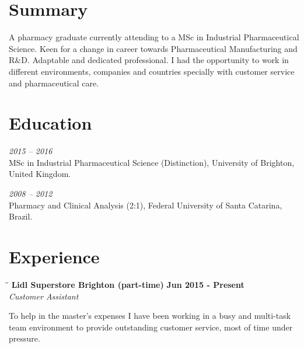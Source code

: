 \documentclass[margin]{res}
\begin{document}
  

\address{Brighton, UK \\ gra.gadotti@gmail.com \\ Phone: +44 07405105756 \\ Post Code: BN21HF }
                           
                        
\begin{resume}                        
 
\section{Summary} A pharmacy graduate currently attending to a MSc in Industrial Pharmaceutical Science.
Keen for a change in career towards Pharmaceutical Manufacturing and R\&D. Adaptable and dedicated
professional. I had the opportunity to work in different environments, companies and countries
specially with customer service and pharmaceutical care.
 
\section{Education}
\textit{2015 – 2016}\\
MSc in Industrial Pharmaceutical Science (Distinction), University of Brighton, United Kingdom.

\textit{2008 – 2012}\\
Pharmacy and Clinical Analysis (2:1), Federal University of Santa Catarina, Brazil.

\section{Experience}

\vspace{-0.1in}
   \begin{tabbing}
   \hspace{2.3in}\= \hspace{1.7in}\= \kill %
    \textbf{Lidl Superstore Brighton (part-time)} \>\>\textbf{Jun 2015 - Present}\\
    \textit{Customer Assistant}\\        
   \end{tabbing}\vspace{-20pt}      %
To help in the master's expenses I have been working in a busy and multi-task team environment to provide
outstanding customer service, most of time under pressure.


\end{resume}
\end{document}
